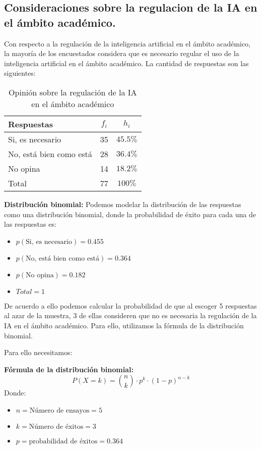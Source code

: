 \subsection{Consideraciones sobre la regulacion de la IA en el ámbito académico.}

Con respecto a la regulación de la inteligencia artificial en el ámbito académico, la mayoría de los encuestados considera que es necesario regular el uso de la inteligencia artificial en el ámbito académico. La cantidad de respuestas son las siguientes:

\begin{table}[H]
  \centering
  \renewcommand{\arraystretch}{1.5}
  \begin{tabular}{l c c }
    \hline
    Respuestas & \(f_i\) & \(h_i\) \\
    \hline
    Si, es necesario & 35 & \(45.5\%\) \\
    No, está bien como está & 28 & \(36.4\%\) \\
    No opina & 14 & \(18.2\%\) \\
    \hline
    Total & 77 & \(100\%\) \\
  \end{tabular}
  \caption{Opinión sobre la regulación de la IA en el ámbito académico}
  \label{tabla:regulacionIA}
\end{table}

\textbf{Distribución binomial:} Podemos modelar la distribución de las respuestas como una distribución binomial, donde la probabilidad de éxito para cada una de las respuestas es: 

\begin{itemize}
  \item \(p(\text{Si, es necesario}) = 0.455\)
  \item \(p(\text{No, está bien como está}) = 0.364\)
  \item \(p(\text{No opina}) = 0.182\)
  \item \(Total = 1\)
\end{itemize}

De acuerdo a ello podemos calcular la probabilidad de que al escoger 5 respuestas al azar de la muestra, 3 de ellas consideren que no es necesaria la regulación de la IA en el ámbito académico. Para ello, utilizamos la fórmula de la distribución binomial.

Para ello necesitamos:

\textbf{Fórmula de la distribución binomial:}
\begin{equation*}
  P(X = k) = \binom{n}{k} \cdot p^k \cdot (1 - p)^{n - k}
\end{equation*}
Donde: 
\begin{itemize}
  \item \(n = \text{Número de ensayos} = 5\)
  \item \(k = \text{Número de éxitos} = 3\)
  \item \(p = \text{probabilidad de éxitos} = 0.364\)
\end{itemize}

